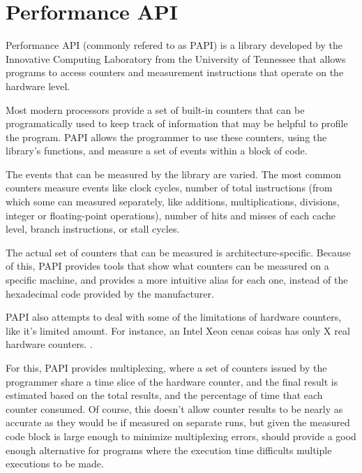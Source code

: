 \section{Performance API}
\label{sec:papi}


Performance API \cite{papi} (commonly refered to as PAPI) is a library developed by the Innovative Computing  Laboratory from the University of Tennessee that allows programs to access counters and measurement instructions that operate on the hardware level.

Most modern processors provide a set of built-in counters that can be programatically used to keep track of information that may be helpful to profile the program. PAPI allows the programmer to use these counters, using the library's functions, and measure a set of events within a block of code.

The events that can be measured by the library are varied. The most common counters measure events like clock cycles, number of total instructions (from which some can measured separately, like additions, multiplications, divisions, integer or floating-point operations), number of hits and misses of each cache level, branch instructions, or stall cycles.

The actual set of counters that can be measured is architecture-specific. Because of this, PAPI provides tools that show what counters can be measured on a specific machine, and provides a more intuitive alias for each one, instead of the hexadecimal code provided by the manufacturer.

PAPI also attempts to deal with some of the limitations of hardware counters, like it's limited amount. For instance, an Intel Xeon cenas coisas has only X real hardware counters. .

For this, PAPI provides multiplexing, where a set of counters issued by the programmer share a time slice of the hardware counter, and the final result is estimated based on the total results, and the percentage of time that each counter consumed. Of course, this doesn't allow counter results to be nearly as accurate as they would be if measured on separate runs, but given the measured code block is large enough to minimize multiplexing errors, should provide a good enough alternative for programs where the execution time difficults multiple executions to be made.